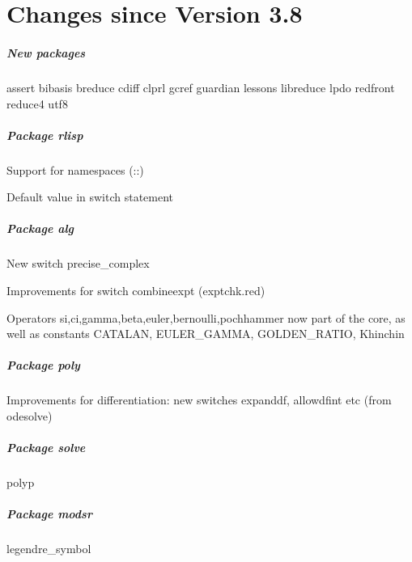 \chapter{Changes since Version 3.8}

\paragraph*{New packages}

assert
bibasis
breduce
cdiff
clprl
gcref
guardian
lessons
libreduce
lpdo
redfront
reduce4
utf8

\paragraph*{Package rlisp}

Support for namespaces (::)

Default value in switch statement


\paragraph*{Package alg}

New switch precise\_complex

Improvements for switch combineexpt (exptchk.red)

Operators si,ci,gamma,beta,euler,bernoulli,pochhammer now part of the core, 
as well as 
constants CATALAN, EULER\_GAMMA, GOLDEN\_RATIO, Khinchin

\paragraph*{Package poly}

Improvements for differentiation: new switches expanddf, allowdfint etc (from odesolve)

\paragraph*{Package solve}

polyp

\paragraph*{Package modsr}

legendre\_symbol

